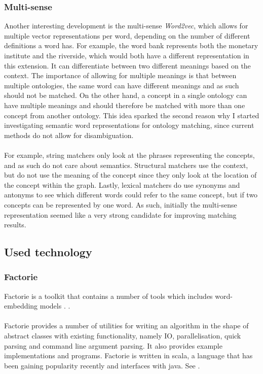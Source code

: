 \documentclass{article}
\begin{document}
 \subsubsection{Multi-sense} \label{multisense}
 Another interesting development is the multi-sense \emph{Word2vec}, which allows for multiple vector representations per word, depending on the number of different definitions a word has. For example, the word bank represents both the monetary institute and the riverside, which would both have a different representation in this extension. It can differentiate between two different meanings based on the context. The importance of allowing for multiple meanings is that between multiple ontologies, the same word can have different meanings and as such should not be matched. On the other hand, a concept in a single ontology can have multiple meanings and should therefore be matched with more than one concept from another ontology\cite{multisense}. This idea sparked the second reason why I started investigating semantic word representations for ontology matching, since current methods do not allow for disambiguation.
 \paragraph{}
 For example, string matchers only look at the phrases representing the concepts, and as such do not care about semantics. Structural matchers use the context, but do not use the meaning of the concept since they only look at the location of the concept within the graph. Lastly, lexical matchers do use synonyms and antonyms to see which different words could refer to the same concept, but if two concepts can be represented by one word. As such, initially the multi-sense representation seemed like a very strong candidate for improving matching results.
 
 \subsection{Used technology}
 \subsubsection{Factorie} \label{factorie}
 Factorie is a toolkit that contains a number of tools which includes word-embedding models \cite{git-factorie}. \cite{w2v}.
 \paragraph{}
 Factorie provides a number of utilities for writing an algorithm in the shape of abstract classes with existing functionality, namely IO, parallelisation, quick parsing and command line argument parsing. It also provides example implementations and programs. Factorie is written in scala, a language that has been gaining popularity recently and interfaces with java. See \cite{scala}. 
\end{document}
